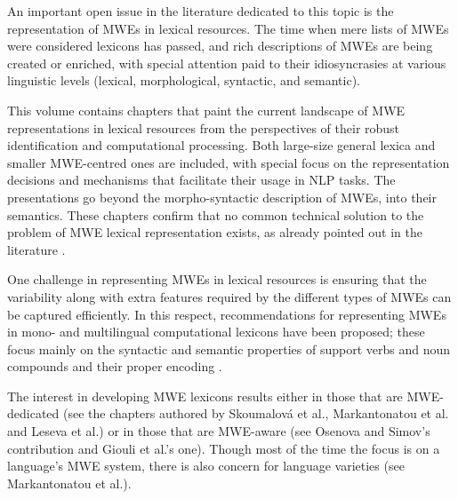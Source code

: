 \begin{refsection}









An important open issue in the literature dedicated to this topic is the representation of MWEs in lexical resources. The time when mere lists of MWEs were considered lexicons has passed, and rich descriptions of MWEs are being created or enriched, with special attention paid to their idiosyncrasies at various linguistic levels (lexical, morphological, syntactic, and semantic). 

This volume contains chapters that paint the current landscape of MWE representations in lexical resources from the perspectives of their robust identification and computational processing. Both large-size general lexica and smaller MWE-centred ones are included, with special focus on the representation decisions and mechanisms that facilitate their usage in NLP tasks. The presentations go beyond the morpho-syntactic description of MWEs, into their semantics. These chapters confirm that no common technical solution to the problem of MWE lexical representation exists, as already pointed out in the literature \citep{lichte-etal}.

One challenge in representing MWEs in lexical resources is ensuring that the variability along with extra features required by the different types of MWEs can be captured efficiently. In this respect, recommendations for representing MWEs in mono- and multilingual computational lexicons have been proposed; these focus mainly on the syntactic and semantic properties of support verbs and noun compounds and their proper encoding \citep{calzolari_etal_2002,copestake_etal_2002}.

The interest in developing MWE lexicons results either in those that are MWE-dedicated (see the chapters authored by Skoumalová et al., Markantonatou et al. and Leseva et al.) or in those that are MWE-aware (see Osenova and Simov's contribution and Giouli et al.'s one). Though most of the time the focus is on a language's MWE system, there is also concern for language varieties (see Markantonatou et al.).


\end{refsection}
